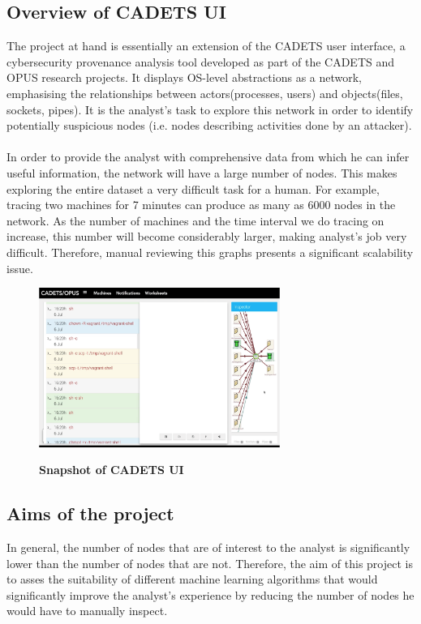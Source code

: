 	\subsection{Overview of CADETS UI}\label{1.1.1}
	The project at hand is essentially an extension of the CADETS user interface, a cybersecurity provenance analysis tool developed as part of the CADETS and OPUS research projects. It displays OS-level abstractions as a network, emphasising the relationships between actors(processes, users) and objects(files, sockets, pipes). It is the analyst's task to explore this network in order to identify potentially suspicious nodes (i.e. nodes describing activities done by an attacker). 
	\\ \\
	In order to provide the analyst with comprehensive data from which he can infer useful information, the network will have a large number of nodes. This makes exploring the entire dataset a very difficult task for a human.  For example, tracing two machines for 7 minutes can produce as many as 6000 nodes in the network.  As the number of machines and the time interval we do tracing on increase, this number will become considerably larger, making analyst's job very difficult. Therefore, manual reviewing this graphs presents a significant scalability issue. 
	\begin{figure}[H]
		\caption{\bf Snapshot of CADETS UI}
		\centering
		\includegraphics[width=0.7\textwidth]{graphics/CADETS}
		\label{Figure 1.1}
	\end{figure}
	
	\subsection{Aims of the project}
	In general, the number of nodes that are of interest to the analyst is significantly lower than the number of nodes that are not. Therefore, the aim of this project is to asses the suitability of different machine learning algorithms that would significantly improve the analyst's experience by reducing the number of nodes he would have to manually inspect. 
	
